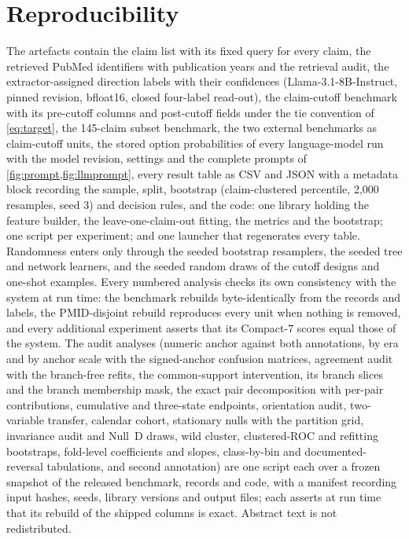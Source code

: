 \documentclass[11pt]{article}
\newcommand{\compact}{Compact-7\xspace}
\begin{document}
\section{Reproducibility}
\label{app:repro}
The artefacts contain the claim list with its fixed query for every claim, the retrieved PubMed
identifiers with publication years and the retrieval audit, the extractor-assigned direction labels
with their confidences (Llama-3.1-8B-Instruct, pinned revision, bfloat16, closed four-label
read-out), the claim-cutoff benchmark with its pre-cutoff columns and post-cutoff fields under the
tie convention of \cref{eq:target}, the 145-claim subset benchmark, the two external benchmarks as claim-cutoff
units, the stored option probabilities of every language-model run with the model revision,
settings and the complete prompts of \cref{fig:prompt,fig:llmprompt}, every result
table as CSV and JSON with a metadata block recording the sample, split, bootstrap (claim-clustered
percentile, 2{,}000 resamples, seed 3) and decision rules, and the code: one library holding the
feature builder, the leave-one-claim-out fitting, the metrics and the bootstrap;
one script per experiment; and one launcher that regenerates every table. Randomness enters only through the seeded bootstrap resamplers, the seeded
tree and network learners, and the seeded random draws of the cutoff designs and one-shot
examples. Every numbered analysis checks its own consistency with the system at run time: the
benchmark rebuilds byte-identically from the records and labels, the PMID-disjoint rebuild
reproduces every unit when nothing is removed, and every additional experiment asserts that its
\compact scores equal those of the system. The audit analyses (numeric anchor against both
annotations, by era and by anchor scale with the signed-anchor confusion matrices, agreement audit
with the branch-free refits, the common-support intervention, its branch slices and the branch
membership mask, the exact pair decomposition with per-pair contributions, cumulative and
three-state endpoints, orientation audit, two-variable transfer, calendar cohort, stationary nulls
with the partition grid, invariance audit and Null~D draws, wild cluster, clustered-ROC and
refitting bootstraps, fold-level coefficients and slopes, class-by-bin and documented-reversal
tabulations, and second annotation) are one script each over a
frozen snapshot of the released benchmark, records and code, with a manifest recording input
hashes, seeds, library versions and output files; each asserts at run time that its rebuild of the
shipped columns is exact. Abstract text is not redistributed.
\end{document}
